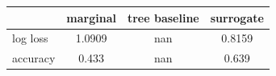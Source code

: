 \begin{tabular}{lccc}
\toprule
 & marginal & tree baseline & surrogate \\
\midrule
log loss & 1.0909 & nan & 0.8159 \\
accuracy & 0.433 & nan & 0.639 \\
\bottomrule
\end{tabular}

